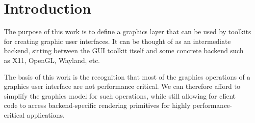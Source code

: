 \chapter{Introduction}
%

The purpose of this work is to define a graphics layer that can be
used by \commonlisp{} toolkits for creating graphic user interfaces.
It can be thought of as an intermediate backend, sitting between the
GUI toolkit itself and some concrete backend such as X11, OpenGL,
Wayland, etc.

The basis of this work is the recognition that most of the graphics
operations of a graphics user interface are not performance critical.
We can therefore afford to simplify the graphics model for such
operations, while still allowing for client code to access
backend-specific rendering primitives for highly performance-critical
applications.

